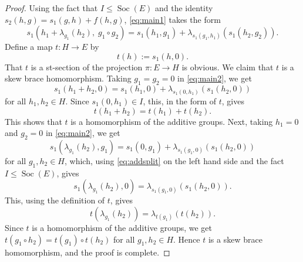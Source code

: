 \documentclass[11pt]{amsart}
\theoremstyle{thrm}
\theoremstyle{plain}
\theoremstyle{definition}
\newcommand{\Soc}{\operatorname{Soc} }
\numberwithin{equation}{section}
\begin{document}
\begin{proof}
	
Using the fact that $I \le \Soc(E)$ and the identity $s_2(h, g) = s_1(g, h) + f(h, g)$, \eqref{eq:main1} takes the form
	\begin{equation}\label{eq:main2}
		s_1(h_1 + \lambda_{g_1}(h_2),\; g_1 \circ g_2) = s_1(h_1, g_1) + \lambda_{s_1(g_1, h_1)}(s_1(h_2, g_2)).
	\end{equation}
Define a map \( t : H \to E \) by
	\[
	t(h) := s_1(h, 0).
	\]
	That $t$ is a st-section of the projection \( \pi : E \to H \) is obvious. We claim that \( t \) is a skew brace homomorphism. Taking  \( g_1 = g_2 = 0 \) in  \eqref{eq:main2}, we get
	$$s_1(h_1 + h_2, 0) = s_1(h_1, 0) + \lambda_{s_1(0, h_1)}(s_1(h_2, 0))$$
	for all  \( h_1, h_2 \in H \). 	Since \( s_1(0, h_1) \in I \), this, in the form of $t$, gives
	\[
	t(h_1 + h_2) = t(h_1) + t(h_2).
	\]
This shows that \( t \) is a homomorphism of the additive groups. Next, taking  \( h_1 = 0 \) and \( g_2 = 0 \) in \eqref{eq:main2}, we get
$$s_1(\lambda_{g_1}(h_2), g_1) = s_1(0, g_1) + \lambda_{s_1(g_1, 0)}(s_1(h_2, 0))$$
for all $g_1, h_2 \in H$, which,
	using  \eqref{eq:addsplit} on the left hand side and the fact $I \le \Soc(E)$, gives
	\[
	s_1(\lambda_{g_1}(h_2), 0) = \lambda_{s_1(g_1, 0)}(s_1(h_2, 0)).
	\]
	This, using the definition of $t$, gives 
	\[
	t(\lambda_{g_1}(h_2)) = \lambda_{t(g_1)}(t(h_2)).
	\]
Since $t$ is  a homomorphism of the additive groups, we get $t(g_1 \circ h_2) = t(g_1) \circ t(h_2)$ for all $g_1, h_2 \in H$. Hence $t$ is a skew brace homomorphism, and the proof is complete. 		
\end{proof}
\end{document}
